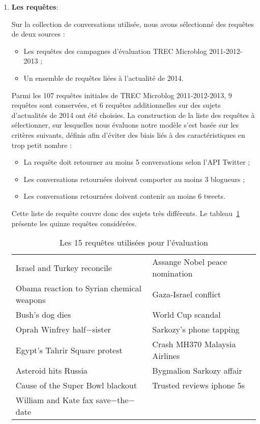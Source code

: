 \documentclass{article-hermes}
\begin{document}
\begin{enumerate}
\item \textbf{Les requêtes}:
\par Sur la collection de conversations utilisée, nous avons sélectionné des requêtes de deux sources :
\begin{itemize}
\item Les requêtes des campagnes d'évaluation TREC Microblog 2011-2012-2013 ;
\item Un ensemble de requêtes liées à l'actualité de 2014.
\end{itemize} 

\par Parmi les 107 requêtes initiales de TREC Microblog 2011-2012-2013, 9 requêtes sont conservées, et 6 requêtes additionnelles sur des sujets d'actualités de 2014 ont été choisies. 
La construction de la liste des requêtes à sélectionner, sur lesquelles nous évaluons notre modèle s'est basée sur les critères suivants, définis afin d'éviter des biais liés à des caractéristiques en trop petit nombre : 
\begin{itemize}
\item La requête doit retourner au moins 5 conversations selon l'API Twitter ;
\item Les conversations retournées doivent comporter au moins 3 blogueurs ;
\item Les conversations retournées doivent contenir au moins 6 tweets.
\end{itemize} 

Cette liste de requête couvre donc des sujets très différents. Le tableau~\ref{tab:queries} présente les quinze requêtes considérées.
\begin{table}[htb]
\center
\caption{\label{tab:queries}Les 15 requêtes utilisées pour l'évaluation}
\begin{tabular}{|l|l|}
  \hline
  Israel and Turkey reconcile & Assange Nobel peace nomination \\
  Obama reaction to Syrian chemical weapons & Gaza-Israel conflict\\
  Bush's dog dies & World Cup scandal \\
  Oprah Winfrey half$-$sister  & Sarkozy's phone tapping \\
  Egypt's Tahrir Square protest & Crash MH370 Malaysia Airlines\\
  Asteroid hits Russia &  Bygmalion Sarkozy affair\\
  Cause of the Super Bowl blackout & Trusted reviews iphone 5s  \\
  William and Kate fax save$-$the$-$date  & \\
  \hline
\end{tabular}
\end{table} 
 

\end{enumerate}
\end{document}

